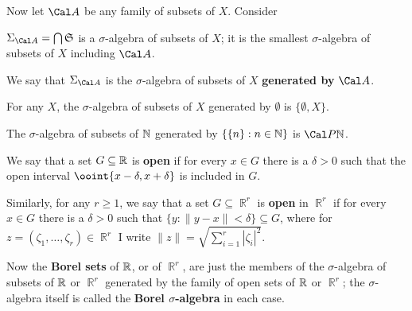  Now let $\Cal A$ be any family of subsets of
$X$.   Consider


\noindent{} $\Sigma_{\Cal A}=\bigcap\frak S$ is a $\sigma$-algebra of subsets of
$X$;  it is the smallest $\sigma$-algebra of subsets
of $X$ including $\Cal A$.

We say that $\Sigma_{\Cal A}$ is the $\sigma$-algebra of subsets of $X$
{\bf generated by} $\Cal A$.

\medskip

 For any $X$, the $\sigma$-algebra of subsets
of $X$ generated by $\emptyset$ is $\{\emptyset,X\}$.

\medskip

 The
$\sigma$-algebra of subsets of $\Bbb N$ generated by
$\{\{n\}:n\in\Bbb N\}$ is $\Cal P\Bbb N$.

 We say that a set $G\subseteq\Bbb R$ is {\bf
open} if for
every $x\in G$ there is a $\delta>0$ such that the open interval
$\ooint{x-\delta,x+\delta}$ is included in $G$.

\medskip

 Similarly, for any $r\ge 1$, we say that a set
$G\subseteq\BbbR^r$ is {\bf open} in $\BbbR^r$ if for every $x\in G$
there is a $\delta>0$ such that $\{y:\|y-x\|<\delta\}\subseteq G$,
where for $z=(\zeta_1,\ldots,\zeta_r)\in\BbbR^r$ I write
$\|z\|=\sqrt{\sum_{i=1}^r|\zeta_i|^2}$.

 Now the {\bf Borel sets} of $\Bbb R$, or of
$\BbbR^r$, are
just the members of the $\sigma$-algebra of subsets of $\Bbb R$ or
$\BbbR^r$ generated by the family of open sets of $\Bbb R$ or $\BbbR^r$;
the $\sigma$-algebra itself is called the {\bf Borel $\sigma$-algebra}
in each case.


